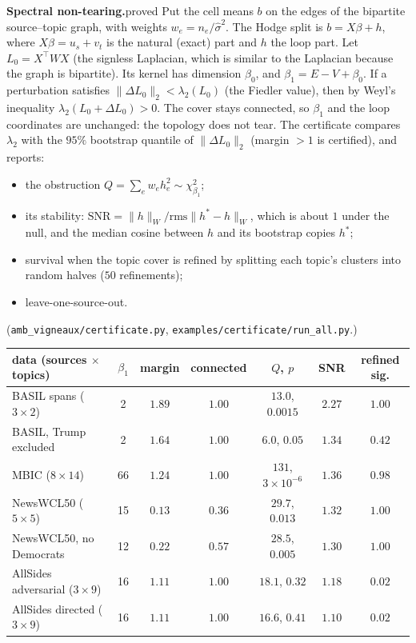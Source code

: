 \documentclass[11pt]{article}
\theoremstyle{definition}
\theoremstyle{remark}
\newcommand{\st}[1]{\textsf{\small\color{gray}#1}}
\begin{document}
\textbf{Spectral non-tearing.}\st{proved} Put the cell means $b$ on the edges of the bipartite source--topic graph, with weights $w_e=n_e/\hat\sigma^2$. The Hodge split is $b=X\beta+h$, where $X\beta=u_s+v_t$ is the natural (exact) part and $h$ the loop part. Let $L_0=X^\top WX$ (the signless Laplacian, which is similar to the Laplacian because the graph is bipartite). Its kernel has dimension $\beta_0$, and $\beta_1=E-V+\beta_0$. If a perturbation satisfies $\|\Delta L_0\|_2<\lambda_2(L_0)$ (the Fiedler value), then by Weyl's inequality $\lambda_2(L_0+\Delta L_0)>0$. The cover stays connected, so $\beta_1$ and the loop coordinates are unchanged: the topology does not tear. The certificate compares $\lambda_2$ with the $95\%$ bootstrap quantile of $\|\Delta L_0\|_2$ (margin $>1$ is certified), and reports:
\begin{itemize}
  \item the obstruction $Q=\sum_e w_eh_e^2\sim\chi^2_{\beta_1}$;
  \item its stability: $\mathrm{SNR}=\|h\|_W/\mathrm{rms}\|h^*-h\|_W$, which is about $1$ under the null, and the median cosine between $h$ and its bootstrap copies $h^*$;
  \item survival when the topic cover is refined by splitting each topic's clusters into random halves ($50$ refinements);
  \item leave-one-source-out.
\end{itemize}
(\texttt{amb\_vigneaux/certificate.py}, \texttt{examples/certificate/run\_all.py}.)
\begin{center}\small
\begin{tabular}{lcccccc}
\toprule
data (sources $\times$ topics) & $\beta_1$ & margin & connected & $Q$, $p$ & SNR & refined sig.\\
\midrule
BASIL spans ($3\times2$) & 2 & $1.89$ & $1.00$ & $13.0$, $0.0015$ & $2.27$ & $1.00$\\
BASIL, Trump excluded & 2 & $1.64$ & $1.00$ & $6.0$, $0.05$ & $1.34$ & $0.42$\\
MBIC ($8\times14$) & 66 & $1.24$ & $1.00$ & $131$, $3\times10^{-6}$ & $1.36$ & $0.98$\\
NewsWCL50 ($5\times5$) & 15 & $\mathbf{0.13}$ & $\mathbf{0.36}$ & $29.7$, $0.013$ & $1.32$ & $1.00$\\
NewsWCL50, no Democrats & 12 & $\mathbf{0.22}$ & $\mathbf{0.57}$ & $28.5$, $0.005$ & $1.30$ & $1.00$\\
AllSides adversarial ($3\times9$) & 16 & $1.11$ & $1.00$ & $18.1$, $0.32$ & $1.18$ & $0.02$\\
AllSides directed ($3\times9$) & 16 & $1.11$ & $1.00$ & $16.6$, $0.41$ & $1.10$ & $0.02$\\
\bottomrule
\end{tabular}
\end{center}
\end{document}
